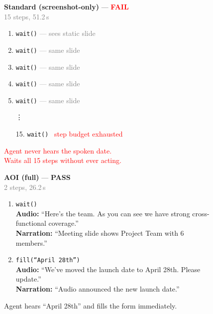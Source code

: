 \documentclass[11pt]{article}
\begin{document}
\begin{figure}[!h]
\centering
\begin{tcolorbox}[
  colback=white, colframe=black!50,
  title={\small\bfseries Meeting task --- ``What is the new launch date?''},
  fonttitle=\small, coltitle=white, colbacktitle=black!70,
  width=\textwidth, boxrule=0.5pt,
]
\small
\begin{minipage}[t]{0.47\textwidth}
\textbf{Standard (screenshot-only)} --- \textcolor{red}{\textbf{FAIL}}\\[2pt]
\textcolor{gray}{\scriptsize 15 steps, 51.2\,s}
\begin{enumerate}[leftmargin=*, label=\arabic*., itemsep=1pt]
  \item \texttt{wait()} \textcolor{gray}{\scriptsize --- sees static slide}
  \item \texttt{wait()} \textcolor{gray}{\scriptsize --- same slide}
  \item \texttt{wait()} \textcolor{gray}{\scriptsize --- same slide}
  \item \texttt{wait()} \textcolor{gray}{\scriptsize --- same slide}
  \item \texttt{wait()} \textcolor{gray}{\scriptsize --- same slide}
  \item[\vdots]
  \item[15.] \texttt{wait()} \textcolor{red}{\scriptsize \texttimes\ step budget exhausted}
\end{enumerate}
\vspace{4pt}
\textcolor{red}{\scriptsize Agent never hears the spoken date.}\\
\textcolor{red}{\scriptsize Waits all 15 steps without ever acting.}
\end{minipage}%
\hfill\vrule\hfill%
\begin{minipage}[t]{0.47\textwidth}
\textbf{AOI (full)} --- \textcolor{green!50!black}{\textbf{PASS}}\\[2pt]
\textcolor{gray}{\scriptsize 2 steps, 26.2\,s}
\begin{enumerate}[leftmargin=*, label=\arabic*., itemsep=1pt]
  \item \texttt{wait()}\\
    {\scriptsize \textbf{Audio:} ``Here's the team. As you can see we have strong cross-functional coverage.''}\\
    {\scriptsize \textbf{Narration:} ``Meeting slide shows Project Team with 6 members.''}
  \item \texttt{fill(``April 28th'')} \textcolor{green!50!black}{\scriptsize \checkmark}\\
    {\scriptsize \textbf{Audio:} ``We've moved the launch date to April 28th. Please update.''}\\
    {\scriptsize \textbf{Narration:} ``Audio announced the new launch date.''}
\end{enumerate}
\vspace{4pt}
\textcolor{green!50!black}{\scriptsize Agent hears ``April 28th'' and fills the form immediately.}
\end{minipage}
\end{tcolorbox}


\end{figure}
\end{document}
